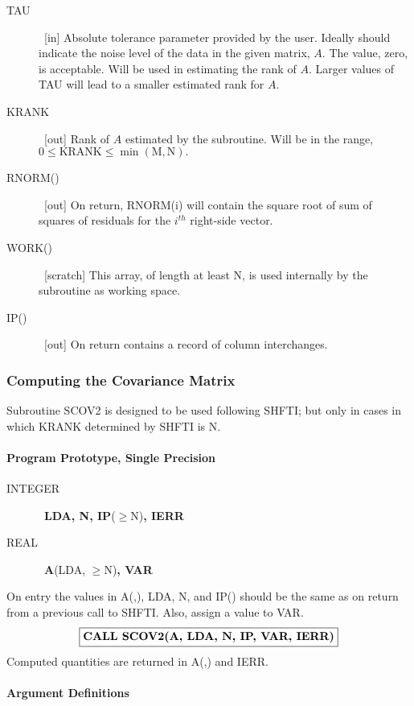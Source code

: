 \documentclass[twoside]{MATH77}
\begin{document}
\begin{description}
\item[TAU]  \ [in] Absolute tolerance parameter provided by the user.
Ideally should indicate the noise level of the data in the given matrix, $A$.
The value, zero, is acceptable. Will be used in estimating the rank of $A$.
Larger values of TAU will lead to a smaller estimated rank for $A$.

\item[KRANK]  \ [out] Rank of $A$ estimated by the subroutine. Will be in the
range, $0\leq \text{KRANK}\leq \min (\text{M},\text{N}).$

\item[RNORM()]  \ [out] On return, RNORM(i) will contain the square root of
sum of squares of residuals for the $i^{th}$ right-side vector.

\item[WORK()]  \ [scratch] This array, of length at least N, is used
internally by the subroutine as working space.

\item[IP()]  \ [out] On return contains a record of column interchanges.
\end{description}

\subsubsection{Computing the Covariance Matrix}

Subroutine SCOV2 is designed to be used following SHFTI; but only in cases
in which KRANK determined by SHFTI is N.

\paragraph{Program Prototype, Single Precision}

\begin{description}
\item[INTEGER]  \ {\bf LDA, N, IP}($\geq $N){\bf , IERR}

\item[REAL]  \ {\bf A}(LDA, $\geq $N){\bf , VAR}
\end{description}

On entry the values in A(,), LDA, N, and IP() should be the same as on
return from a previous call to SHFTI. Also, assign a value to VAR.
$$
\fbox{{\bf CALL SCOV2(A, LDA, N, IP, VAR, IERR)}}
$$
Computed quantities are returned in A(,) and IERR.

\paragraph{Argument Definitions}
\end{document}
